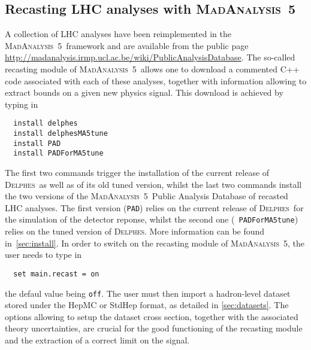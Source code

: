 \documentclass[a4paper]{article}
\newcommand{\MA}{\textsc{MadAnalysis}~5}
\newcommand{\DEL}{\textsc{Delphes}}
\begin{document}
\vspace{2cm}
\begin{shaded}
\section{\Large Recasting LHC analyses with \MA}
\end{shaded}
A collection of LHC analyses have been reimplemented in the \MA\ framework and
are available from the public page
\href{http://madanalysis.irmp.ucl.ac.be/wiki/PublicAnalysisDatabase}
{http://madanalysis.irmp.ucl.ac.be/wiki/PublicAnalysisDatabase}. The so-called
recasting module of \MA\ allows one to download a commented C++ code associated
with each of these analyses, together with information allowing to extract
bounds on a given new physics signal. This download is achieved by typing in
{\color{ao} \begin{verbatim}
  install delphes
  install delphesMA5tune
  install PAD
  install PADForMA5tune
\end{verbatim}}
\noindent The first two commands trigger the installation of the current release
of \DEL\ as well as of its old tuned version, whilst the last two commands
install the two versions of the \MA\ Public Analysis Database of recasted LHC
analyses. The first version ({\tt PAD}) relies on the current release of \DEL\
for the simulation of the detector reponse, whilst the second one ({\tt
PADForMA5tune}) relies on the
tuned version of \DEL. More information can be found in~\autoref{sec:install}.
In order to switch on the recasting module of \MA, the user needs to type in
{\color{ao} \begin{verbatim}
  set main.recast = on
\end{verbatim}}
\noindent the defaul value being \verb|off|. The user must then import a
hadron-level dataset stored under the HepMC or StdHep format, as detailed in
\autoref{sec:datasets}. The options allowing to setup the dataset cross section,
together with the associated theory uncertainties, are crucial for
the good functioning of the recasting module and the extraction of a correct
limit on the signal.
\end{document}
